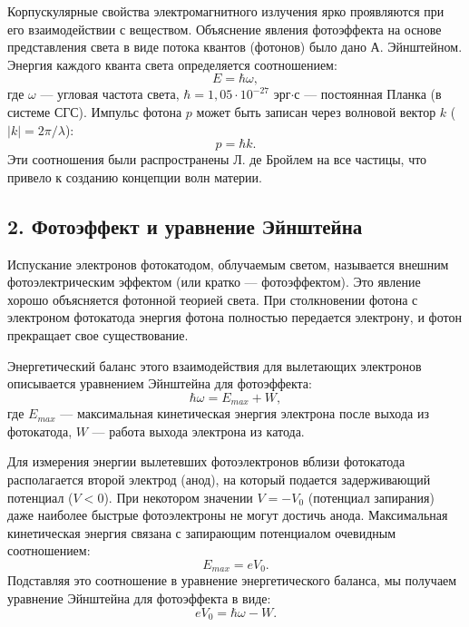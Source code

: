 \documentclass[12pt, a4paper]{article}
\begin{document}
Корпускулярные свойства электромагнитного излучения ярко проявляются при его взаимодействии с веществом. Объяснение явления фотоэффекта на основе представления света в виде потока квантов (фотонов) было дано А. Эйнштейном. Энергия каждого кванта света определяется соотношением:
\begin{equation}
    E = \hbar\omega,
\end{equation}
где $\omega$ --- угловая частота света, $\hbar = 1{,}05 \cdot 10^{-27}$ эрг$\cdot$с --- постоянная Планка (в системе СГС). Импульс фотона $p$ может быть записан через волновой вектор $k$ ($|k| = 2\pi/\lambda$):
\begin{equation}
    p = \hbar k.
\end{equation}
Эти соотношения были распространены Л. де Бройлем на все частицы, что привело к созданию концепции волн материи.

\subsection*{2. Фотоэффект и уравнение Эйнштейна}
Испускание электронов фотокатодом, облучаемым светом, называется внешним фотоэлектрическим эффектом (или кратко --- фотоэффектом). Это явление хорошо объясняется фотонной теорией света. При столкновении фотона с электроном фотокатода энергия фотона полностью передается электрону, и фотон прекращает свое существование. 

Энергетический баланс этого взаимодействия для вылетающих электронов описывается уравнением Эйнштейна для фотоэффекта:
\begin{equation}
    \hbar\omega = E_{max} + W,
\end{equation}
где $E_{max}$ --- максимальная кинетическая энергия электрона после выхода из фотокатода, $W$ --- работа выхода электрона из катода.

Для измерения энергии вылетевших фотоэлектронов вблизи фотокатода располагается второй электрод (анод), на который подается задерживающий потенциал ($V < 0$). При некотором значении $V = -V_0$ (потенциал запирания) даже наиболее быстрые фотоэлектроны не могут достичь анода. Максимальная кинетическая энергия связана с запирающим потенциалом очевидным соотношением:
\begin{equation}
    E_{max} = eV_0.
\end{equation}
Подставляя это соотношение в уравнение энергетического баланса, мы получаем уравнение Эйнштейна для фотоэффекта в виде:
\begin{equation}
    eV_0 = \hbar\omega - W.
\end{equation}
\end{document}

